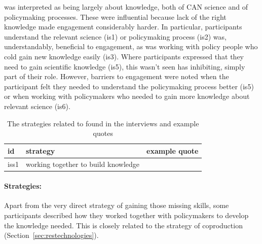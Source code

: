 \ismis{} was interpreted as being largely about knowledge, both of CAN science and of policymaking processes. These were influential because lack of the right knowledge made engagement considerably harder. In particular, participants understand the relevant science (is1) or policymaking process (is2) was, understandably, beneficial to engagement, as was working with policy people who cold gain new knowledge easily (is3). Where participants expressed that they need to gain scientific knowledge (is5), this wasn't seen has inhibiting, simply part of their role. However, barriers to engagement were noted when the participant felt they needed to understand the policymaking process better (is5) or when working with policymakers who needed to gain more knowledge about relevant science (is6). 

\begin{table}[!ht]
\footnotesize
\caption{The strategies related to \ismis{} found in the interviews and example quotes}\label{tab:resskillsstrat}
\begin{tabular}{L{.06\linewidth}L{.3\linewidth}L{.64\linewidth}} \hline
\textbf{id} & \textbf{strategy} & \textbf{example quote} \\ \hline \hline
iss1 & working together to build knowledge &  \\[5mm] \hline
 \end{tabular}
\end{table}

\paragraph{Strategies:}
Apart from the very direct strategy of gaining those missing skills, some participants described how they worked together with policymakers to develop the knowledge needed. This is closely related to the strategy of coproduction (Section~\ref{sec:restechnologies}).

\subsubsection{\ismih}\label{sec:resismhabit}

